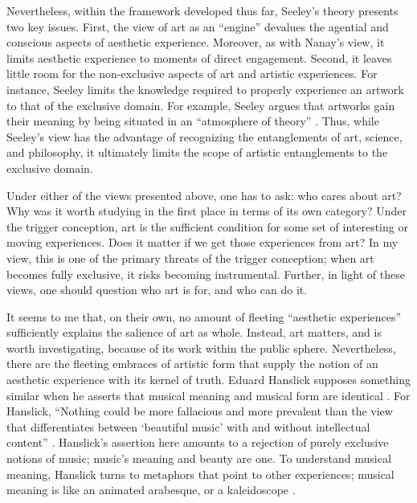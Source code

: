 \documentclass[12pt,letterpaper]{article}
\begin{document}
Nevertheless, within the framework developed thus far, Seeley's theory presents
two key issues. First, the view of art as an ``engine'' devalues the agential
and conscious aspects of aesthetic experience. Moreover, as with Nanay's view,
it limits aesthetic experience to moments of direct engagement. Second, it
leaves little room for the non-exclusive aspects of art and artistic
experiences. For instance, Seeley limits the knowledge required to properly
experience an artwork to that of the exclusive domain. For example, Seeley
argues that artworks gain their meaning by being situated in an ``atmosphere of
theory'' \autocite[42]{arendtFuture1968}. Thus, while Seeley's view has the
advantage of recognizing the entanglements of art, science, and philosophy, it
ultimately limits the scope of artistic entanglements to the exclusive domain.

Under either of the views presented above, one has to ask: who cares about art?
Why was it worth studying in the first place in terms of its own category? Under
the trigger conception, art is the sufficient condition for some set of
interesting or moving experiences. Does it matter if we get those experiences
from art? In my view, this is one of the primary threats of the trigger
conception; when art becomes fully exclusive, it risks becoming instrumental.
Further, in light of these views, one should question who art is for, and who
can do it.

It seems to me that, on their own, no amount of fleeting ``aesthetic
experiences'' sufficiently explains the salience of art as whole. Instead, art
matters, and is worth investigating, because of its work within the public
sphere. Nevertheless, there are the fleeting embraces of artistic form that
supply the notion of an aesthetic experience with its kernel of truth. Eduard
Hanslick supposes something similar when he asserts that musical meaning and
musical form are identical \autocite[46--47]{hanslickEduard2018}. For Hanslick,
``Nothing could be more fallacious and more prevalent than the view that
differentiates between `beautiful music' with and without intellectual content''
\autocite[46--47]{hanslickEduard2018}. Hanslick's assertion here amounts to a
rejection of purely exclusive notions of music; music's meaning and beauty are
one. To understand musical meaning, Hanslick turns to metaphors that point to
other experiences; musical meaning is like an animated arabesque, or a
kaleidoscope \autocite[41--42]{hanslickEduard2018}.
\end{document}
